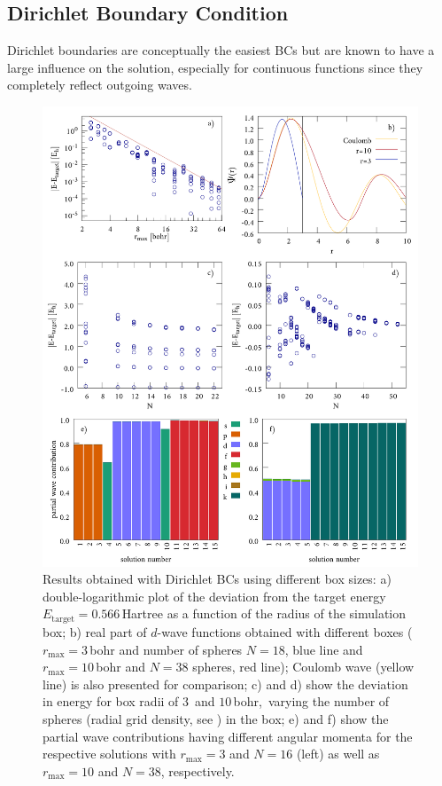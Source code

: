 \subsection{Dirichlet Boundary Condition}
\label{sec:DBCbench}
Dirichlet boundaries are conceptually the easiest BCs but are known to have a large influence on the solution, especially for continuous functions since they completely reflect outgoing waves.
\begin{figure}
\includegraphics[width=\textwidth]{Figures/BC/DirichletBC}
\caption{Results obtained with Dirichlet BCs using different box sizes:
a) double-logarithmic plot of the deviation from the target energy $E_\text{target}=0.566\,$Hartree as a function of the radius of the simulation box;
b) real part of $d$-wave functions obtained with different boxes ($r_\text{max}=3\,$bohr and number of spheres $N=18$, blue line and $r_\text{max}=10\,$bohr and $N=38$ spheres, red line); Coulomb wave (yellow line) is also presented for comparison;
c) and d) show the deviation in energy for box radii of $3\,$ and $10\,$bohr,\ varying the number of spheres (radial grid density, see ) in the box;
e) and f) show the partial wave contributions  having different angular momenta for the respective solutions with $r_\text{max}=3$ and $N=16$ (left) as well as $r_\text{max}=10$ and $N=38$, respectively.}
\label{fig:dbcRad}
\end{figure}
